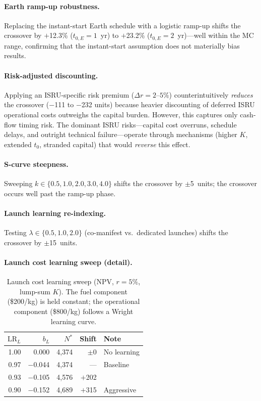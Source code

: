 \documentclass[preprint,12pt]{elsarticle}
\begin{document}
\paragraph{Earth ramp-up robustness.}
\label{sec:earth_ramp}
Replacing the instant-start Earth schedule with a logistic ramp-up shifts the crossover by $+$12.3\% ($t_{0,E} = 1$~yr) to $+$23.2\% ($t_{0,E} = 2$~yr)---well within the MC range, confirming that the instant-start assumption does not materially bias results.

\paragraph{Risk-adjusted discounting.}
\label{sec:risk_premium}
Applying an ISRU-specific risk premium ($\Delta r = 2$--$5\%$) counterintuitively \emph{reduces} the crossover ($-$111 to $-$232 units) because heavier discounting of deferred ISRU operational costs outweighs the capital burden. However, this captures only cash-flow timing risk. The dominant ISRU risks---capital cost overruns, schedule delays, and outright technical failure---operate through mechanisms (higher $K$, extended $t_0$, stranded capital) that would \emph{reverse} this effect.

\paragraph{S-curve steepness.} Sweeping $k \in \{0.5, 1.0, 2.0, 3.0, 4.0\}$ shifts the crossover by $\pm$5~units; the crossover occurs well past the ramp-up phase.

\paragraph{Launch learning re-indexing.} Testing $\lambda \in \{0.5, 1.0, 2.0\}$ (co-manifest vs.\ dedicated launches) shifts the crossover by $\pm$15~units.

\paragraph{Launch cost learning sweep (detail).}

\begin{table}[htbp]
\centering
\caption{Launch cost learning sweep (NPV, $r = 5\%$, lump-sum $K$). The fuel component (\$200/kg) is held constant; the operational component (\$800/kg) follows a Wright learning curve.}
\label{tab:launch_learning}
\small
\begin{tabular}{@{}rrrrl@{}}
\toprule
$\mathrm{LR}_L$ & $b_L$ & $N^*$ & Shift & Note \\
\midrule
1.00 & 0.000  & 4{,}374 & $\pm$0 & No learning \\
0.97 & $-$0.044 & 4{,}374 & ---    & Baseline \\
0.93 & $-$0.105 & 4{,}576 & $+$202 & \\
0.90 & $-$0.152 & 4{,}689 & $+$315 & Aggressive \\
\bottomrule
\end{tabular}
\end{table}
\end{document}
